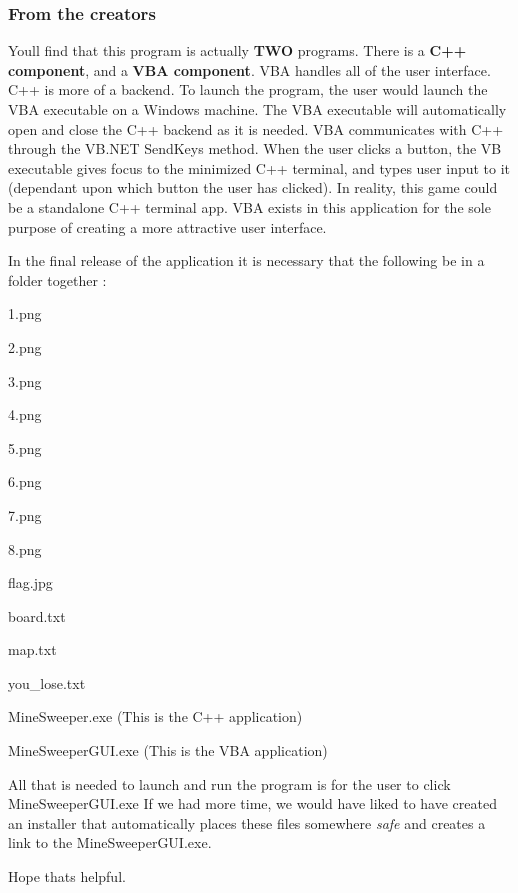 \subsubsection*{From the creators}

You\textquotesingle{}ll find that this program is actually {\bfseries{T\+WO}} programs. There is a {\bfseries{C++ component}}, and a {\bfseries{V\+BA component}}. V\+BA handles all of the user interface. C++ is more of a backend. To launch the program, the user would launch the V\+BA executable on a Windows machine. The V\+BA executable will automatically open and close the C++ backend as it is needed. V\+BA communicates with C++ through the V\+B.\+N\+ET Send\+Keys method. When the user clicks a button, the VB executable gives focus to the minimized C++ terminal, and types user input to it (dependant upon which button the user has clicked). In reality, this game could be a standalone C++ terminal app. V\+BA exists in this application for the sole purpose of creating a more attractive user interface.

In the final release of the application it is necessary that the following be in a folder together \+:
\begin{DoxyItemize}
\item 1.\+png
\item 2.\+png
\item 3.\+png
\item 4.\+png
\item 5.\+png
\item 6.\+png
\item 7.\+png
\item 8.\+png
\item flag.\+jpg
\item board.\+txt
\item map.\+txt
\item you\+\_\+lose.\+txt
\item Mine\+Sweeper.\+exe (This is the C++ application)
\item Mine\+Sweeper\+G\+U\+I.\+exe (This is the V\+BA application)
\end{DoxyItemize}

All that is needed to launch and run the program is for the user to click Mine\+Sweeper\+G\+U\+I.\+exe If we had more time, we would have liked to have created an installer that automatically places these files somewhere {\itshape safe} and creates a link to the Mine\+Sweeper\+G\+U\+I.\+exe.

Hope that\textquotesingle{}s helpful. 